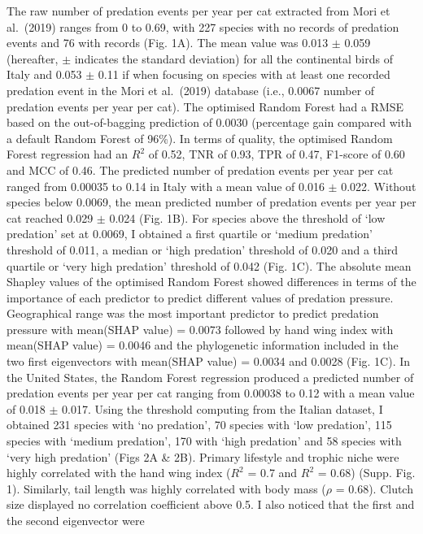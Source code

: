 \documentclass[
  super,
  review,
  3p]{elsarticle}
\begin{document}
The raw number of predation events per year per cat extracted from Mori
et al.~(2019) ranges from 0 to 0.69, with 227 species with no records of
predation events and 76 with records (Fig. 1A). The mean value was 0.013
\(\pm\) 0.059 (hereafter, \(\pm\) indicates the standard deviation) for
all the continental birds of Italy and 0.053 \(\pm\) 0.11 if when
focusing on species with at least one recorded predation event in the
Mori et al.~(2019) database (i.e., 0.0067 number of predation events per
year per cat). The optimised Random Forest had a RMSE based on the
out-of-bagging prediction of 0.0030 (percentage gain compared with a
default Random Forest of 96\%). In terms of quality, the optimised
Random Forest regression had an \(R^{2}\) of 0.52, TNR of 0.93, TPR of
0.47, F1-score of 0.60 and MCC of 0.46. The predicted number of
predation events per year per cat ranged from 0.00035 to 0.14 in Italy
with a mean value of 0.016 \(\pm\) 0.022. Without species below 0.0069,
the mean predicted number of predation events per year per cat reached
0.029 \(\pm\) 0.024 (Fig. 1B). For species above the threshold of `low
predation' set at 0.0069, I obtained a first quartile or `medium
predation' threshold of 0.011, a median or `high predation' threshold of
0.020 and a third quartile or `very high predation' threshold of 0.042
(Fig. 1C). The absolute mean Shapley values of the optimised Random
Forest showed differences in terms of the importance of each predictor
to predict different values of predation pressure. Geographical range
was the most important predictor to predict predation pressure with
mean(\textbar SHAP value\textbar) = 0.0073 followed by hand wing index
with mean(\textbar SHAP value\textbar) = 0.0046 and the phylogenetic
information included in the two first eigenvectors with
mean(\textbar SHAP value\textbar) = 0.0034 and 0.0028 (Fig. 1C). In the
United States, the Random Forest regression produced a predicted number
of predation events per year per cat ranging from 0.00038 to 0.12 with a
mean value of 0.018 \(\pm\) 0.017. Using the threshold computing from
the Italian dataset, I obtained 231 species with `no predation', 70
species with `low predation', 115 species with `medium predation', 170
with `high predation' and 58 species with `very high predation' (Figs 2A
\& 2B). Primary lifestyle and trophic niche were highly correlated with
the hand wing index (\(R^{2}\) = 0.7 and \(R^{2}\) = 0.68) (Supp. Fig.
1). Similarly, tail length was highly correlated with body mass
(\(\rho\) = 0.68). Clutch size displayed no correlation coefficient
above 0.5. I also noticed that the first and the second eigenvector were
\end{document}
